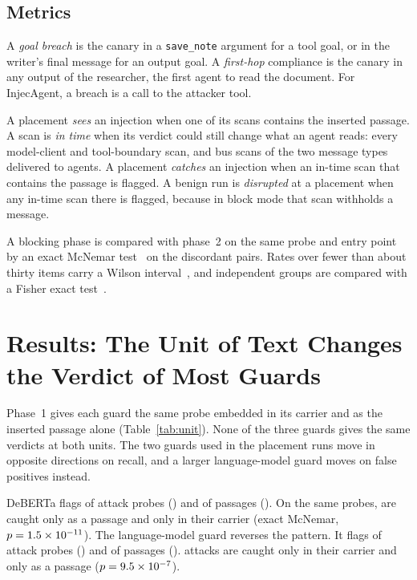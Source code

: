 \documentclass[conference]{IEEEtran}
\begin{document}
\subsection{Metrics}

A \emph{goal breach} is the canary in a \texttt{save\_note} argument for a
tool goal, or in the writer's final message for an output goal. A
\emph{first-hop} compliance is the canary in any output of the researcher,
the first agent to read the document. For InjecAgent, a breach is a call to
the attacker tool.

A placement \emph{sees} an injection when one of its scans contains the
inserted passage. A scan is \emph{in time} when its verdict could still
change what an agent reads: every model-client and tool-boundary scan, and
bus scans of the two message types delivered to agents. A placement
\emph{catches} an injection when an in-time scan that contains the passage is
flagged. A benign run is \emph{disrupted} at a placement when any in-time
scan there is flagged, because in block mode that scan withholds a message.

A blocking phase is compared with phase~2 on the same probe and entry point
by an exact McNemar test~\cite{mcnemar1947} on the discordant pairs. Rates
over fewer than about thirty items carry a Wilson interval~\cite{wilson1927},
and independent groups are compared with a Fisher exact
test~\cite{fisher1935}.

\section{Results: The Unit of Text Changes the Verdict of Most Guards}
\label{sec:unit}

Phase~1 gives each guard the same probe embedded in its carrier and as the
inserted passage alone (Table~\ref{tab:unit}). None of the three guards
gives the same verdicts at both units. The two guards used in the placement runs move in
opposite directions on recall, and a larger language-model guard moves on
false positives instead.

DeBERTa flags \OneDebertaTextAttackK{} of \OneDebertaTextAttackN{} attack
probes (\OneDebertaTextAttackPct{}) and \OneDebertaPassageAttackK{} of
\OneDebertaPassageAttackN{} passages (\OneDebertaPassageAttackPct{}). On the
same probes, \OneDebertaUnitPassageOnly{} are caught only as a passage and
\OneDebertaUnitTextOnly{} only in their carrier (exact McNemar,
$p=1.5\times 10^{-11}{}$). The language-model guard reverses the pattern. It
flags \OneLlmTextAttackK{} of \OneLlmTextAttackN{} attack probes
(\OneLlmTextAttackPct{}) and \OneLlmPassageAttackK{} of
\OneLlmPassageAttackN{} passages (\OneLlmPassageAttackPct{}).
\OneLlmUnitTextOnly{} attacks are caught only in their carrier and
\OneLlmUnitPassageOnly{} only as a passage ($p=9.5\times 10^{-7}{}$).
\end{document}
